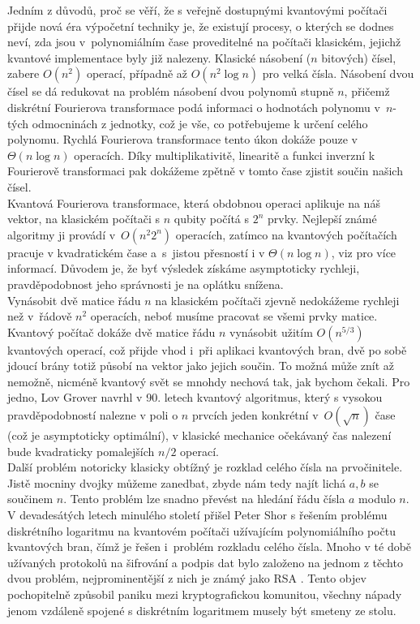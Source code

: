 \documentclass [12pt]{report}
\begin{document}
Jedním z důvodů, proč se věří, že s veřejně dostupnými kvantovými počítači přijde nová éra výpočetní techniky je, že existují procesy, o kterých se dodnes neví, zda jsou v~polynomiálním čase proveditelné na počítači klasickém, jejichž kvantové implementace byly již nalezeny. Klasické násobení ($n$ bitových) čísel, zabere $O(n^2)$ operací, případně až $O(n^2 \log n)$ pro velká čísla. Násobení dvou čísel se dá redukovat na problém násobení dvou polynomů stupně $n$, přičemž diskrétní Fourierova transformace podá informaci o hodnotách polynomu v~$n$-tých odmocninách z jednotky, což je vše, co potřebujeme k určení celého polynomu. Rychlá Fourierova transformace tento úkon dokáže pouze v $\Theta(n \log n)$ operacích. Díky multiplikativitě, linearitě a funkci inverzní k Fourierově transformaci pak dokážeme zpětně v tomto čase zjistit součin našich čísel.\\

Kvantová Fourierova transformace, která obdobnou operaci aplikuje na náš vektor, na klasickém počítači s $n$ qubity počítá s $2^n$ prvky. Nejlepší známé algoritmy ji provádí v~$O (n^2 2^n)$  operacích, zatímco na kvantových počítačích pracuje v kvadratickém čase a~s~jistou přesností i v $\Theta(n \log n)$, viz \cite[Ch. 4. a 5.]{Chuang} pro více informací. Důvodem je, že byť výsledek získáme asymptoticky rychleji, pravděpodobnost jeho správnosti je na oplátku snížena.\\

Vynásobit dvě matice řádu $n$ na klasickém počítači zjevně nedokážeme rychleji než v~řádově $n^2$ operacích, neboť musíme pracovat se všemi prvky matice. Kvantový počítač dokáže dvě matice řádu $n$ vynásobit užitím $O(n^{5/3})$ kvantových operací, což přijde vhod i~při aplikaci kvantových bran, dvě po sobě jdoucí brány totiž působí na vektor jako jejich součin. To možná může znít až nemožně, nicméně kvantový svět se mnohdy nechová tak, jak bychom čekali. Pro jedno, Lov Grover \cite{Grover} navrhl v 90. letech kvantový algoritmus, který s vysokou pravděpodobností nalezne v poli o $n$ prvcích jeden konkrétní v~$O(\sqrt{n})$ čase (což je asymptoticky optimální), v klasické mechanice očekávaný čas nalezení bude kvadraticky pomalejších $n/2$ operací.\\
 
Další problém notoricky klasicky obtížný je rozklad celého čísla na prvočinitele. Jistě mocniny dvojky můžeme zanedbat, zbyde nám tedy najít lichá $a,b$ se součinem $n$. Tento problém lze snadno převést na hledání řádu čísla $a$ modulo $n$. V devadesátých letech minulého století přišel Peter Shor \cite{Shor} s řešením problému diskrétního logaritmu na kvantovém počítači užívajícím polynomiálního počtu kvantových bran, čímž je řešen i~problém rozkladu celého čísla. Mnoho v té době užívaných protokolů na šifrování a podpis dat bylo založeno na jednom z těchto dvou problém, nejprominentější z nich je známý jako RSA \cite{RSA}. Tento objev pochopitelně způsobil paniku mezi kryptografickou komunitou, všechny nápady jenom vzdáleně spojené s diskrétním logaritmem musely být smeteny ze stolu.\\
\end{document}
